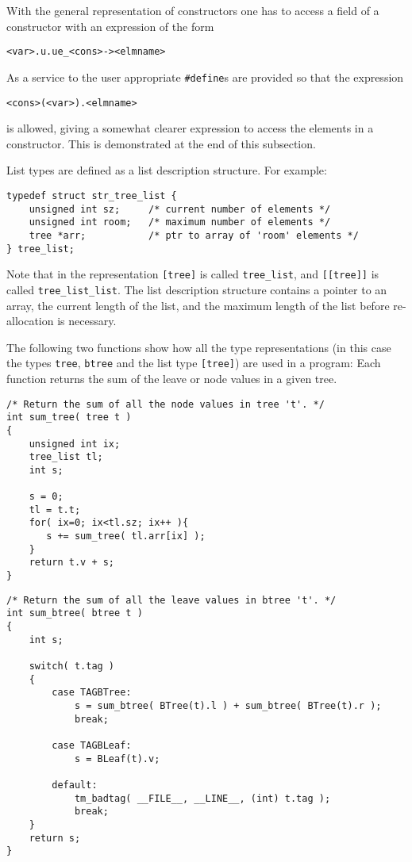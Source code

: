 \par
With the general representation of constructors
one has to access a field of a constructor with an
expression of the form
\begin{verbatim}
<var>.u.ue_<cons>-><elmname>
\end{verbatim}
As a service to the user appropriate {\tt \#define}s are provided
so that the expression
\begin{verbatim}
<cons>(<var>).<elmname>
\end{verbatim}
is allowed,
giving a somewhat clearer expression to access the elements in
a constructor.
This is demonstrated at the end of this subsection.
\par
List types are defined as a list description structure.
For example:
\begin{verbatim}
typedef struct str_tree_list {
    unsigned int sz;     /* current number of elements */
    unsigned int room;   /* maximum number of elements */
    tree *arr;           /* ptr to array of 'room' elements */
} tree_list;
\end{verbatim}
Note that in the {\C} representation \verb+[tree]+ is called
\verb+tree_list+, and \verb+[[tree]]+ is called \verb+tree_list_list+.
The list description structure contains a pointer to an array,
the current length of the list,
and the maximum length of the list before re-allocation is necessary.
\par
The following two functions show how all the type representations
(in this case the types {\tt tree}, {\tt btree} and the list type
\verb+[tree]+)
are used in a program:
Each function returns the sum of the leave or node values in a given
tree.
\begin{verbatim}
/* Return the sum of all the node values in tree 't'. */
int sum_tree( tree t )
{
    unsigned int ix;
    tree_list tl;
    int s;

    s = 0;
    tl = t.t;
    for( ix=0; ix<tl.sz; ix++ ){
       s += sum_tree( tl.arr[ix] );
    }
    return t.v + s;
}
\end{verbatim}

\begin{verbatim}
/* Return the sum of all the leave values in btree 't'. */
int sum_btree( btree t )
{
    int s;

    switch( t.tag )
    {
        case TAGBTree:
            s = sum_btree( BTree(t).l ) + sum_btree( BTree(t).r );
            break;

        case TAGBLeaf:
            s = BLeaf(t).v;

        default:
            tm_badtag( __FILE__, __LINE__, (int) t.tag );
            break;
    }
    return s;
}
\end{verbatim}
